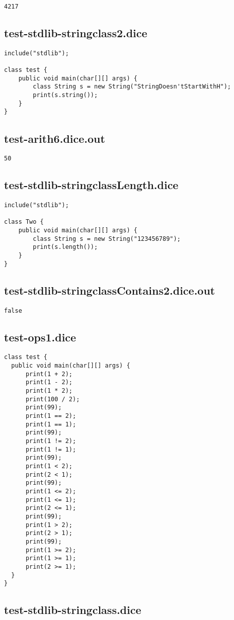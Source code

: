 \begin{verbatim}
4217
\end{verbatim}\pagebreak\subsection{test-stdlib-stringclass2.dice}
\begin{verbatim}
include("stdlib");

class test {
	public void main(char[][] args) {
        class String s = new String("StringDoesn'tStartWithH");
        print(s.string());
	}
}

\end{verbatim}\pagebreak\subsection{test-arith6.dice.out}
\begin{verbatim}
50
\end{verbatim}\pagebreak\subsection{test-stdlib-stringclassLength.dice}
\begin{verbatim}
include("stdlib");

class Two {
	public void main(char[][] args) {
        class String s = new String("123456789");
        print(s.length());
	}
}

\end{verbatim}\pagebreak\subsection{test-stdlib-stringclassContains2.dice.out}
\begin{verbatim}
false
\end{verbatim}\pagebreak\subsection{test-ops1.dice}
\begin{verbatim}
class test {
  public void main(char[][] args) {
      print(1 + 2);
      print(1 - 2);
      print(1 * 2);
      print(100 / 2);
      print(99);
      print(1 == 2);
      print(1 == 1);
      print(99);
      print(1 != 2);
      print(1 != 1);
      print(99);
      print(1 < 2);
      print(2 < 1);
      print(99);
      print(1 <= 2);
      print(1 <= 1);
      print(2 <= 1);
      print(99);
      print(1 > 2);
      print(2 > 1);
      print(99);
      print(1 >= 2);
      print(1 >= 1);
      print(2 >= 1);
  }
}

\end{verbatim}\pagebreak\subsection{test-stdlib-stringclass.dice}
